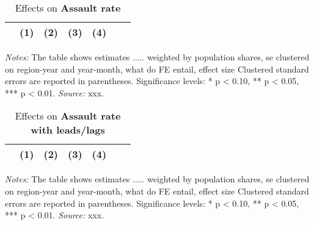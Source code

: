 \documentclass[11pt, a4paper, draft]{article} %
\begin{document}
\vspace*{\fill}
\begin{table}[H] \centering 
	\begin{threeparttable} \centering \caption{Effects on \textbf{Assault rate}}\label{tab_soc_ext:reg_fe_assrate}
		{\def\sym#1{\ifmmode^{#1}\else\(^{#1}\)\fi} 
			\begin{tabular}{l*{6}{c}}
				\toprule 
				&\multicolumn{1}{c}{(1)}&\multicolumn{1}{c}{(2)}&\multicolumn{1}{c}{(3)}&\multicolumn{1}{c}{(4)}\\
				\midrule
				 
				\bottomrule 
		\end{tabular}}
		\begin{tablenotes} 
			\item \scriptsize \emph{Notes:} The table shows estimates ..... 
			weighted by population shares, se clustered on region-year and year-month, what do FE entail, effect size
			Clustered standard errors are reported in parentheses. \newline Significance levels: * p < 0.10, ** p < 0.05, *** p < 0.01. \newline 	\emph{Source:} xxx.
		\end{tablenotes} 
	\end{threeparttable} 
\end{table}
\vspace*{\fill}\clearpage 


\vspace*{\fill}
\begin{table}[H] \centering 
	\begin{threeparttable} \centering \caption{Effects on \textbf{Assault rate with leads/lags}}\label{tab_soc_ext:reg_fe_assrate_leads_lags}
		{\def\sym#1{\ifmmode^{#1}\else\(^{#1}\)\fi} 
			\begin{tabular}{l*{6}{c}}
				\toprule 
				&\multicolumn{1}{c}{(1)}&\multicolumn{1}{c}{(2)}&\multicolumn{1}{c}{(3)}&\multicolumn{1}{c}{(4)}\\
				\midrule
				 
				\bottomrule 
		\end{tabular}}
		\begin{tablenotes} 
			\item \scriptsize \emph{Notes:} The table shows estimates ..... 
			weighted by population shares, se clustered on region-year and year-month, what do FE entail, effect size
			Clustered standard errors are reported in parentheses. \newline Significance levels: * p < 0.10, ** p < 0.05, *** p < 0.01. \newline 	\emph{Source:} xxx.
		\end{tablenotes} 
	\end{threeparttable} 
\end{table}
\vspace*{\fill}\clearpage 
\end{document}

